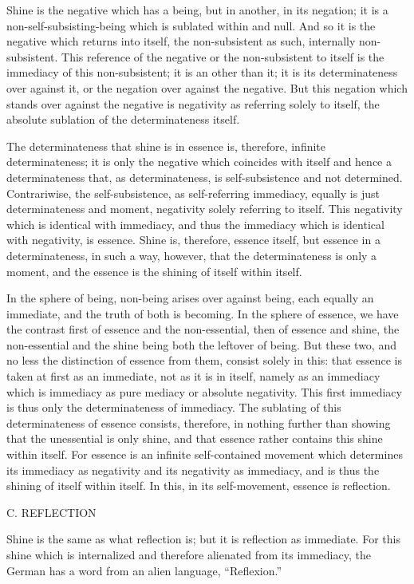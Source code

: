 Shine is the negative which has a being,
but in another, in its negation;
it is a non-self-subsisting-being
which is sublated within and null.
And so it is the negative which returns into itself,
the non-subsistent as such, internally non-subsistent.
This reference of the negative or
the non-subsistent to itself is
the immediacy of this non-subsistent;
it is an other than it;
it is its determinateness over against it,
or the negation over against the negative.
But this negation which stands over against the negative is
negativity as referring solely to itself,
the absolute sublation of the determinateness itself.

The determinateness that shine is in essence is,
therefore, infinite determinateness;
it is only the negative which coincides with itself
and hence a determinateness that, as determinateness,
is self-subsistence and not determined.
Contrariwise, the self-subsistence, as self-referring immediacy,
equally is just determinateness and moment,
negativity solely referring to itself.
This negativity which is identical with immediacy,
and thus the immediacy which is identical with negativity, is essence.
Shine is, therefore, essence itself,
but essence in a determinateness, in such a way, however,
that the determinateness is only a moment,
and the essence is the shining of itself within itself.

In the sphere of being, non-being arises over against being,
each equally an immediate, and the truth of both is becoming.
In the sphere of essence, we have the contrast
first of essence and the non-essential,
then of essence and shine,
the non-essential and the shine being both the leftover of being.
But these two, and no less the distinction of essence from them,
consist solely in this:
that essence is taken at first as an immediate,
not as it is in itself, namely as
an immediacy which is immediacy as pure mediacy or absolute negativity.
This first immediacy is thus only the determinateness of immediacy.
The sublating of this determinateness of essence consists, therefore,
in nothing further than showing that the unessential is only shine,
and that essence rather contains this shine within itself.
For essence is an infinite self-contained movement
which determines its immediacy as negativity
and its negativity as immediacy,
and is thus the shining of itself within itself.
In this, in its self-movement,
essence is reflection.

C. REFLECTION

Shine is the same as what reflection is;
but it is reflection as immediate.
For this shine which is internalized
and therefore alienated from its immediacy,
the German has a word from an alien language, “Reflexion.”

